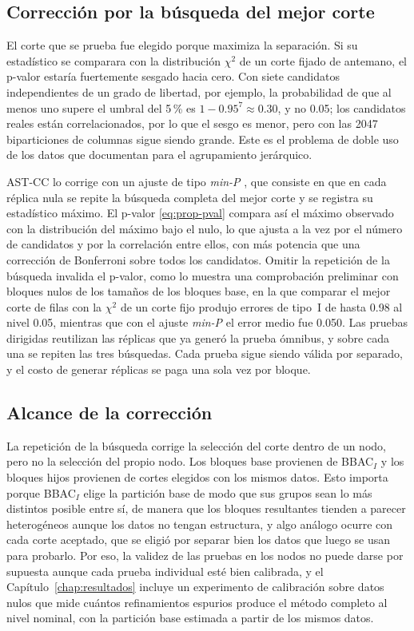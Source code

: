 \subsection{Corrección por la búsqueda del mejor corte}\label{sec:prop-minP}

El corte que se prueba fue elegido porque maximiza la separación. Si su
estadístico se comparara con la distribución $\chi^2$ de un corte fijado de
antemano, el p-valor estaría fuertemente sesgado hacia cero. Con siete candidatos
independientes de un grado de libertad, por ejemplo, la probabilidad de que al
menos uno supere el umbral del 5\,\% es $1-0.95^7\approx 0.30$, y no 0.05; los
candidatos reales están correlacionados, por lo que el sesgo es menor, pero con
las 2047 biparticiones de columnas sigue siendo grande. Este es el
problema de doble uso de los datos que \cite{Gao2024} documentan para el
agrupamiento jerárquico.

AST-CC lo corrige con un ajuste de tipo \emph{min-P} \cite{Westfall1993}, que
consiste en que en cada réplica nula se repite la búsqueda completa del mejor corte y se
registra su estadístico máximo. El p-valor \eqref{eq:prop-pval} compara así el
máximo observado con la distribución del máximo bajo el nulo, lo que ajusta a
la vez por el número de candidatos y por la correlación entre ellos, con más
potencia que una corrección de Bonferroni sobre todos los candidatos. Omitir la
repetición de la búsqueda invalida el p-valor, como lo muestra una comprobación
preliminar con bloques nulos de los tamaños de los bloques base, en la que comparar
el mejor corte de
filas con la $\chi^2$ de un corte fijo produjo errores de tipo~I de hasta 0.98
al nivel 0.05, mientras que con el ajuste \emph{min-P} el error medio fue 0.050.
Las pruebas dirigidas reutilizan las réplicas que ya generó la prueba ómnibus, y
sobre cada una se repiten las tres búsquedas. Cada prueba sigue siendo válida
por separado, y el costo de generar réplicas se paga una sola vez por bloque.

\subsection{Alcance de la corrección}

La repetición de la búsqueda corrige la selección del corte dentro de un nodo,
pero no la selección del propio nodo. Los bloques base provienen de BBAC$_I$ y
los bloques hijos provienen de cortes elegidos con los mismos datos. Esto importa porque BBAC$_I$ elige la partición base de modo que sus grupos sean
lo más distintos posible entre sí, de manera que los bloques resultantes tienden a
parecer heterogéneos aunque los datos no tengan estructura, y algo análogo ocurre
con cada corte aceptado, que se eligió por separar bien los datos que luego se
usan para probarlo. Por eso,
la validez de las pruebas en los nodos no puede darse por supuesta aunque cada
prueba individual esté bien calibrada, y el
Capítulo~\ref{chap:resultados} incluye un experimento de calibración sobre datos
nulos que mide cuántos refinamientos espurios produce el método completo al
nivel nominal, con la partición base estimada a partir de los mismos datos.

